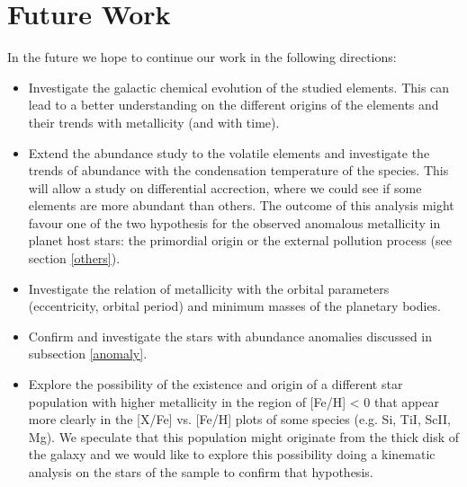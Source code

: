 \documentclass[dvips,12pt,a4paper]{report}
\begin{document}
{{\begin{itemize}
\end{itemize}

\section {Future Work}

In the future we hope to continue our work in the following directions:

\begin{itemize}

\item Investigate the galactic chemical evolution of the studied elements. This can lead to a better understanding on the different origins of the elements and their trends with metallicity (and with time).

\item Extend the abundance study to the volatile elements and investigate the trends of abundance with the condensation temperature of the species. This will allow a study on differential accrection, where we could see if some elements are more abundant than others. The outcome of this analysis might favour one of the two hypothesis for the observed anomalous metallicity in planet host stars: the primordial origin or the external pollution process (see section \ref{others}).

\item Investigate the relation of metallicity with the orbital parameters (eccentricity, orbital period) and minimum masses of the planetary bodies.

\item Confirm and investigate the stars with abundance anomalies discussed in subsection \ref{anomaly}.

\item Explore the possibility of the existence and origin of a different star population with higher metallicity in the region of [Fe/H] < 0 that appear more clearly in the [X/Fe] vs. [Fe/H] plots of some species (e.g. Si, TiI, ScII, Mg). We speculate that this population might originate from the thick disk of the galaxy and we would like to explore this possibility doing a kinematic analysis on the stars of the sample to confirm that hypothesis.

\end{itemize}










}}
\end{document}
